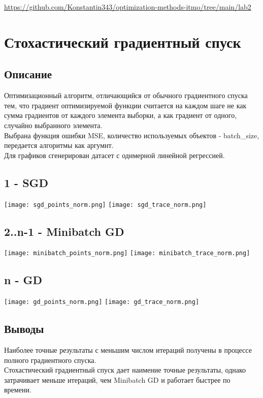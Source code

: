 \documentclass{article}
\title{Лабораторная работа #1}
\author{Крухмалев Константин,Рашо Елизавета,Фролова Дарья, М34371}
\begin{document}
\maketitle


\href{https://github.com/Konstantin343/optimization-methods-itmo/tree/main/lab2}{https://github.com/Konstantin343/optimization-methods-itmo/tree/main/lab2}

\section{Стохастический градиентный спуск}

\subsection{Описание}
Оптимизационный алгоритм, отличающийся от обычного градиентного спуска тем, что градиент оптимизируемой функции считается на каждом шаге не как сумма градиентов от каждого элемента выборки, а как градиент от одного, случайно выбранного элемента. \\
Выбрана функция ошибки MSE, количество используемых объектов - batch\_size, передается алгоритмы как аргумнт.  \\
Для графиков сгенерирован датасет с однмерной линейной регрессией. \\

\subsection{1 - SGD}
\texttt{[image: sgd\_points\_norm.png]}
\texttt{[image: sgd\_trace\_norm.png]}

\subsection{2..n-1 - Minibatch GD}
\texttt{[image: minibatch\_points\_norm.png]}
\texttt{[image: minibatch\_trace\_norm.png]}

\subsection{n - GD}
\texttt{[image: gd\_points\_norm.png]}
\texttt{[image: gd\_trace\_norm.png]}

\subsection{Выводы}
Наиболее точные результаты с меньшим числом итераций получены в процессе полного градиентного спуска. \\
Стохастический градиентный спуск дает наимение точные результаты, однако затрачивает меньше итераций, чем Minibatch GD и работает быстрее по времени. \\
\end{document}
